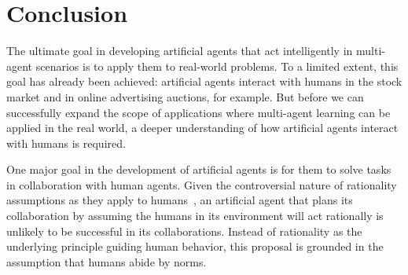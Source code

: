 
\section{Conclusion}

The ultimate goal in developing artificial agents that act
intelligently in multi-agent scenarios is to apply them to real-world
problems.  To a limited extent, this goal has already been achieved:
artificial agents interact with humans in the stock market and in
online advertising auctions, for example.  But before we can
successfully expand the scope of applications where multi-agent
learning can be applied in the real world, a deeper understanding of
how artificial agents interact with humans is required.

One major goal in the development of artificial agents is for them to
solve tasks in collaboration with human agents.  Given the
controversial nature of rationality assumptions as they apply to
humans~\cite{kahnemanst82}, an artificial agent that plans its
collaboration by assuming the humans in its environment will act
rationally is unlikely to be successful in its collaborations.
Instead of rationality as the underlying principle guiding human
behavior, this proposal is grounded in the assumption that humans
abide by norms.




